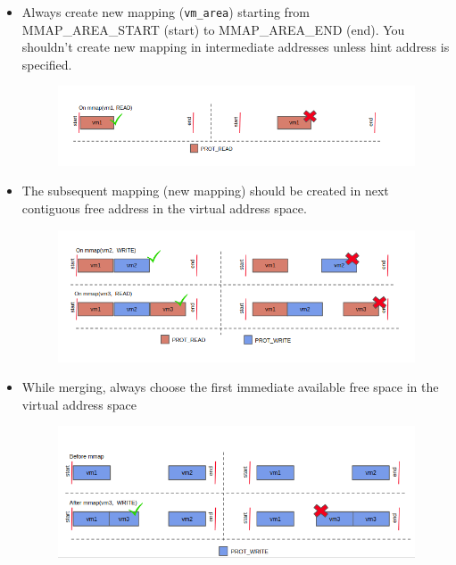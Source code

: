 \documentclass[12pt]{article}
\begin{document}
	\begin{itemize}
	    \item Always create new mapping ({\tt vm\_area}) starting from MMAP\_AREA\_START (start) to MMAP\_AREA\_END (end). You shouldn't create new mapping in intermediate addresses unless hint address is specified. 
	    
	    \begin{figure}[H]
	    \centering
	    \includegraphics[scale=0.6]{mmfig1.png}
	    \label{fig:my_label}
	    \end{figure}
	    
	    \item  The subsequent mapping (new mapping) should be created in next contiguous free address in the virtual address space.
	    
	    \begin{figure}[H]
	    \centering
	    \includegraphics[scale=0.6]{mmfig2.png}
	    \label{fig:my_label}
	    \end{figure}
	    \newpage
	    \item  While merging, always choose the first immediate available free space in the virtual address space
	    
	    \begin{figure}[H]
	    \centering
	    \includegraphics[scale=0.6]{mmfig3.png}
	    \label{fig:my_label}
	    \end{figure}
	\end{itemize}
	
\end{document}
